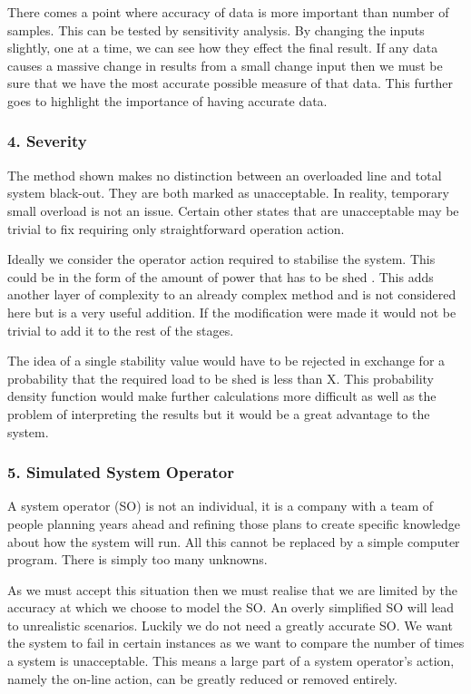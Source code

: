 \documentclass[a4paper,oneside,12pt]{report}
\begin{document}
There comes a point where accuracy of data is more important than number of samples. This can be tested by sensitivity analysis. By changing the inputs slightly, one at a time, we can see how they effect the final result. If any data causes a massive change in results from a small change input then we must be sure that we have the most accurate possible measure of that data. This further goes to highlight the importance of having accurate data.

\subsubsection{4. Severity}\label{sec_limit_severity}

The method shown makes no distinction between an overloaded line and total system black-out. They are both marked as unacceptable. In reality, temporary small overload is not an issue. Certain other states that are unacceptable may be trivial to fix requiring only straightforward operation action.

Ideally we consider the operator action required to stabilise the system. This could be in the form of the amount of power that has to be shed \cite{Kirschen2003}. This adds another layer of complexity to an already complex method and is not considered here but is a very useful addition. If the modification were made it would not be trivial to add it to the rest of the stages.

The idea of a single stability value would have to be rejected in exchange for a probability that the required load to be shed is less than X. This probability density function would make further calculations more difficult as well as the problem of interpreting the results but it would be a great advantage to the system.

\subsubsection{5. Simulated System Operator}

A system operator (SO) is not an individual, it is a company with a team of people planning years ahead and refining those plans to create specific knowledge about how the system will run. All this cannot be replaced by a simple computer program. There is simply too many unknowns.

As we must accept this situation then we must realise that we are limited by the accuracy at which we choose to model the SO. An overly simplified SO will lead to unrealistic scenarios. Luckily we do not need a greatly accurate SO. We want the system to fail in certain instances as we want to compare the number of times a system is unacceptable. This means a large part of a system operator's action, namely the on-line action, can be greatly reduced or removed entirely.
\end{document}
